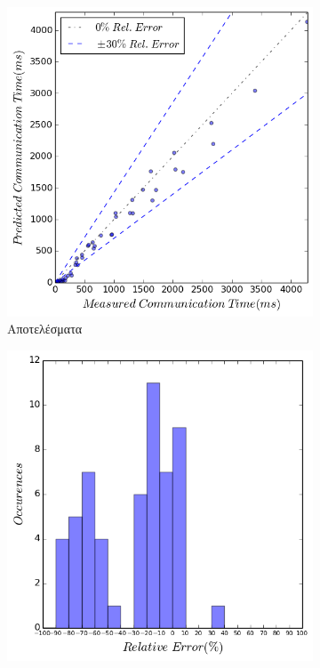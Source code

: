 \begin{figure}[ht]
    \centering
    \captionsetup{justification=centering,margin=0cm,font=footnotesize}
    \begin{subfigure}[b]{0.47\textwidth}
        \includegraphics[width=\textwidth]{./images/NB_UMA/NB_jacobi_res.png}
        \caption{Αποτελέσματα}
        \label{fig:NB_jacobi_UMA_res}
    \end{subfigure}
    \quad %
    \begin{subfigure}[b]{0.47\textwidth}
        \includegraphics[width=\textwidth]{./images/NB_UMA/NB_jacobi_err_dist.png}

\end{subfigure}
\end{figure}
